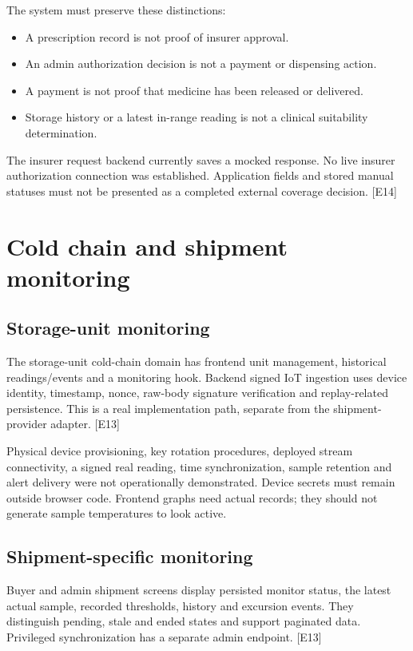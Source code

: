 \documentclass[11pt,a4paper]{article}
\newcommand{\evidence}[1]{\textcolor{muted}{[E#1]}}
\begin{document}
The system must preserve these distinctions:
\begin{itemize}
\item A prescription record is not proof of insurer approval.
\item An admin authorization decision is not a payment or dispensing action.
\item A payment is not proof that medicine has been released or delivered.
\item Storage history or a latest in-range reading is not a clinical suitability determination.
\end{itemize}
The insurer request backend currently saves a mocked response. No live insurer authorization connection was established. Application fields and stored manual statuses must not be presented as a completed external coverage decision. \evidence{14}

\section{Cold chain and shipment monitoring}
\subsection{Storage-unit monitoring}
The storage-unit cold-chain domain has frontend unit management, historical readings/events and a monitoring hook. Backend signed IoT ingestion uses device identity, timestamp, nonce, raw-body signature verification and replay-related persistence. This is a real implementation path, separate from the shipment-provider adapter. \evidence{13}

Physical device provisioning, key rotation procedures, deployed stream connectivity, a signed real reading, time synchronization, sample retention and alert delivery were not operationally demonstrated. Device secrets must remain outside browser code. Frontend graphs need actual records; they should not generate sample temperatures to look active.

\subsection{Shipment-specific monitoring}
Buyer and admin shipment screens display persisted monitor status, the latest actual sample, recorded thresholds, history and excursion events. They distinguish pending, stale and ended states and support paginated data. Privileged synchronization has a separate admin endpoint. \evidence{13}
\end{document}

